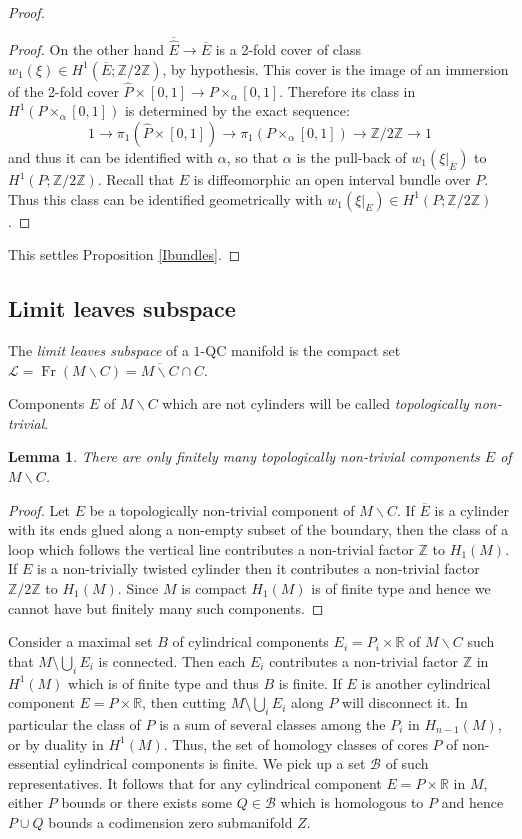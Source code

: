 \documentclass[10pt]{amsart}
\let\mathcal\mathscr
\let\moins\smallsetminus
\DeclareMathOperator{\Fr}{Fr}
\newtheorem{lemma}[theorem]{Lemma}
\theoremstyle{definition}
\theoremstyle{remark}
\numberwithin{equation}{section}
\newcommand{\RR}{\mathbb R}
\newcommand{\ZZ}{\mathbb Z}
\begin{document}
\begin{proof}
\begin{proof}
On the other hand $\overline{\widehat{E}}\to\overline{E}$ is a 2-fold cover of class $w_1(\xi)\in H^1(\overline{E};\ZZ/2\ZZ)$, by hypothesis.
This cover is the image of an immersion of
the 2-fold cover $\widehat{P}\times [0,1]\to P\times_{\alpha} [0,1]$. Therefore its class in
$H^1(P\times_{\alpha} [0,1])$ is determined by the exact sequence:
\[ 1\to \pi_1(\widehat{P}\times [0,1])\to \pi_1(P\times_{\alpha} [0,1])\to \ZZ/2\ZZ\to 1\]
and thus it can be identified with $\alpha$, so that $\alpha$ is the pull-back
of $w_1(\xi|_{\overline{E}})$ to $H^1(P;\ZZ/2\ZZ)$. Recall that $E$ is diffeomorphic an open interval bundle over $P$. Thus this class can be identified geometrically with $w_1(\xi|_{E})\in H^1(P;\ZZ/2\ZZ)$.
\end{proof}
This settles Proposition \ref{Ibundles}.
\end{proof}

\subsection{Limit leaves subspace}
The \emph{limit leaves subspace} of a $1$-QC manifold is
the compact set $\mathcal L=\Fr(M\moins C)=\overline{M\moins C}\cap C$.

Components $E$ of $M\moins C$ which are not cylinders will be called \emph{topologically non-trivial}.
\begin{lemma}
There are only finitely many topologically non-trivial components $E$ of $M\moins C$.
\end{lemma}
\begin{proof}
Let $E$ be a topologically non-trivial component of $M\moins C$.
If $\overline{E}$ is a cylinder with its ends glued along a non-empty subset of the boundary,
then the class of a loop which follows the vertical line
contributes a non-trivial factor $\ZZ$ to $H_1(M)$. If $E$ is a non-trivially twisted cylinder
then it contributes a non-trivial factor $\ZZ/2\ZZ$ to $H_1(M)$. Since $M$ is compact $H_1(M)$ is
of finite type and hence we cannot have but finitely many such components.
\end{proof}

Consider a maximal set $B$ of cylindrical components $E_i=P_i\times \RR$ of $M\moins C$ such that
$M\setminus \bigcup_i E_i$ is connected. Then each $E_i$ contributes a non-trivial factor
$\ZZ$ in $H^1(M)$ which is of finite type and thus $B$ is finite. If $E$ is another
cylindrical component $E=P\times \RR$, then cutting $M\setminus \bigcup_i E_i$ along $P$ will disconnect it.
In particular the class of $P$ is a sum of several classes among the $P_i$ in $H_{n-1}(M)$, or by
duality in $H^1(M)$. Thus, the set of homology classes of cores $P$ of non-essential
cylindrical components is finite. We pick up a set $\mathcal B$ of such representatives.
It follows that for any cylindrical component
$E=P\times \RR$ in $M$, either $P$ bounds or there exists some $Q\in \mathcal B$
which is homologous to $P$ and hence $P\cup Q$ bounds a codimension zero submanifold $Z$.
\end{document}
